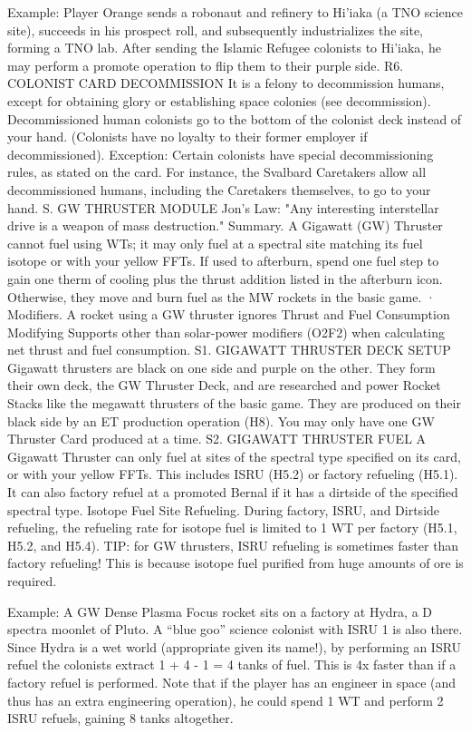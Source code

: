 \documentclass[a4paper]{book}
\begin{document}
Example: Player Orange sends a robonaut and refinery to Hi’iaka (a TNO science site), succeeds in his prospect roll, and subsequently industrializes the site, forming a TNO lab. After sending the Islamic Refugee colonists to Hi’iaka, he may perform a promote operation to flip them to their purple side.
R6. COLONIST CARD DECOMMISSION
It is a felony to decommission humans, except for obtaining glory or establishing space colonies (see decommission). Decommissioned human colonists go to the bottom of the colonist deck instead of your hand. (Colonists have no loyalty to their former employer if decommissioned).
Exception: Certain colonists have special decommissioning rules, as stated on the card. For instance, the Svalbard Caretakers allow all decommissioned humans, including the Caretakers themselves, to go to your hand.
S. GW THRUSTER MODULE
Jon's Law: "Any interesting interstellar drive is a weapon of mass destruction."
Summary. A Gigawatt (GW) Thruster cannot fuel using WTs; it may only fuel at a spectral site matching its fuel isotope or with your yellow FFTs. If used to afterburn, spend one fuel step to gain one therm of cooling plus the thrust addition listed in the afterburn icon. Otherwise, they move and burn fuel as the MW rockets in the basic game.
·       Modifiers. A rocket using a GW thruster ignores Thrust and Fuel Consumption Modifying Supports other than solar-power modifiers (O2F2) when calculating net thrust and fuel consumption.
S1. GIGAWATT THRUSTER DECK SETUP
Gigawatt thrusters are black on one side and purple on the other. They form their own deck, the GW Thruster Deck, and are researched and power Rocket Stacks like the megawatt thrusters of the basic game. They are produced on their black side by an ET production operation (H8).
You may only have one GW Thruster Card produced at a time.
S2. GIGAWATT THRUSTER FUEL
A Gigawatt Thruster can only fuel at sites of the spectral type specified on its card, or with your yellow FFTs. This includes ISRU (H5.2) or factory refueling (H5.1). It can also factory refuel at a promoted Bernal if it has a dirtside of the specified spectral type.
Isotope Fuel Site Refueling. During factory, ISRU, and Dirtside refueling, the refueling rate for isotope fuel is limited to 1 WT per factory (H5.1, H5.2, and H5.4).
TIP: for GW thrusters, ISRU refueling is sometimes faster than factory refueling! This is because isotope fuel purified from huge amounts of ore is required.

Example: A GW Dense Plasma Focus rocket sits on a factory at Hydra, a D spectra moonlet of Pluto. A “blue goo” science colonist with ISRU 1 is also there. Since Hydra is a wet world (appropriate given its name!), by performing an ISRU refuel the colonists extract 1 + 4 - 1 = 4 tanks of fuel. This is 4x faster than if a factory refuel is performed. Note that if the player has an engineer in space (and thus has an extra engineering operation), he could spend 1 WT and perform 2 ISRU refuels, gaining 8 tanks altogether.
\end{document}
